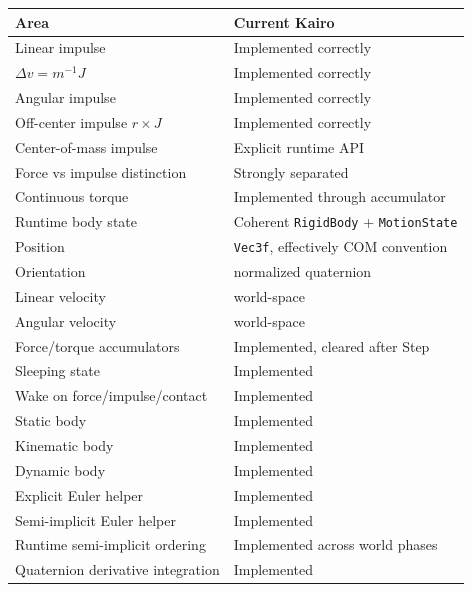 {\def\LTcaptype{none} %
\begin{longtable}[]{@{}
  >{\raggedright\arraybackslash}p{}
  >{\raggedright\arraybackslash}p{}@{}}
\toprule\noalign{}
\begin{minipage}[b]{\linewidth}\raggedright
Area
\end{minipage} & \begin{minipage}[b]{\linewidth}\raggedright
Current Kairo
\end{minipage} \\
\midrule\noalign{}
\endhead
\bottomrule\noalign{}
\endlastfoot
Linear impulse & Implemented correctly \\
\(\Delta v=m^{-1}J\) & Implemented correctly \\
Angular impulse & Implemented correctly \\
Off-center impulse \(r\times J\) & Implemented correctly \\
Center-of-mass impulse & Explicit runtime API \\
Force vs impulse distinction & Strongly separated \\
Continuous torque & Implemented through accumulator \\
Runtime body state & Coherent \texttt{RigidBody} + \texttt{MotionState} \\
Position & \texttt{Vec3f}, effectively COM convention \\
Orientation & normalized quaternion \\
Linear velocity & world-space \\
Angular velocity & world-space \\
Force/torque accumulators & Implemented, cleared after Step \\
Sleeping state & Implemented \\
Wake on force/impulse/contact & Implemented \\
Static body & Implemented \\
Kinematic body & Implemented \\
Dynamic body & Implemented \\
Explicit Euler helper & Implemented \\
Semi-implicit Euler helper & Implemented \\
Runtime semi-implicit ordering & Implemented across world phases \\
Quaternion derivative integration & Implemented \\

\end{longtable}}
